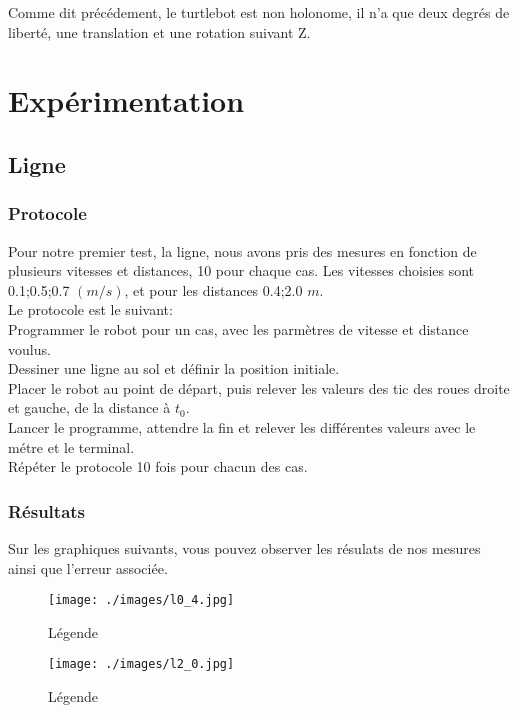 \documentclass[12pt,french]{article}
\begin{document}
Comme dit précédement, le turtlebot est non holonome, il n'a que deux degrés de liberté, une translation et une rotation suivant Z.\\ 


\section{Expérimentation}

\subsection{Ligne}

\subsubsection{Protocole}
Pour notre premier test, la ligne, nous avons pris des mesures en fonction de plusieurs vitesses et distances, 10 pour chaque cas.
Les vitesses choisies sont {0.1;0.5;0.7} $(m/s)$, et pour les distances {0.4;2.0} $m$.\\
Le protocole est le suivant:\\
Programmer le robot pour un cas, avec les parmètres de vitesse et distance voulus. \\
Dessiner une ligne au sol et définir la position initiale.\\
Placer le robot au point de départ, puis relever les valeurs des tic des roues droite et gauche, de la distance à $t_0$.\\
Lancer le programme, attendre la fin et relever les différentes valeurs avec le métre et le terminal.\\
Répéter le protocole 10 fois pour chacun des cas.\\

\vspace{5mm}

\subsubsection{Résultats}

Sur les graphiques suivants, vous pouvez observer les résulats de nos mesures ainsi que l'erreur associée. \\

\begin{figure}[h]
    \begin{minipage}[c]{.46\linewidth}
        \centering
        \texttt{[image: ./images/l0\_4.jpg]}
        \caption{Légende}
    \end{minipage}
    \hfill%
    \begin{minipage}[c]{.46\linewidth}
        \centering
        \texttt{[image: ./images/l2\_0.jpg]}
        \caption{Légende}
    \end{minipage}
\end{figure}
\end{document}
